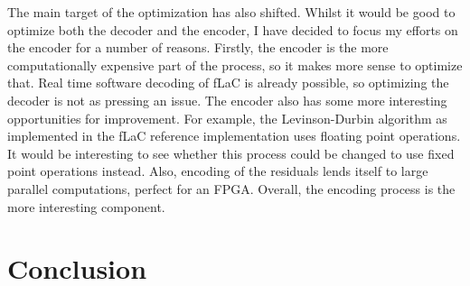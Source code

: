 \documentclass[12pt]{scrartcl}
\begin{document}
  The main target of the optimization has also shifted. Whilst it would be good to optimize both the decoder and the encoder, I have decided to focus my efforts on the encoder for a number of reasons. Firstly, the encoder is the more computationally expensive part of the process, so it makes more sense to optimize that. Real time software decoding of fLaC is already possible, so optimizing the decoder is not as pressing an issue. The encoder also has some more interesting opportunities for improvement. For example, the Levinson-Durbin algorithm as implemented in the fLaC reference implementation uses floating point operations. It would be interesting to see whether this process could be changed to use fixed point operations instead. Also, encoding of the residuals lends itself to large parallel computations, perfect for an FPGA. Overall, the encoding process is the more interesting component.
  
  \section{Conclusion}
  
  
  
  
\end{document}
